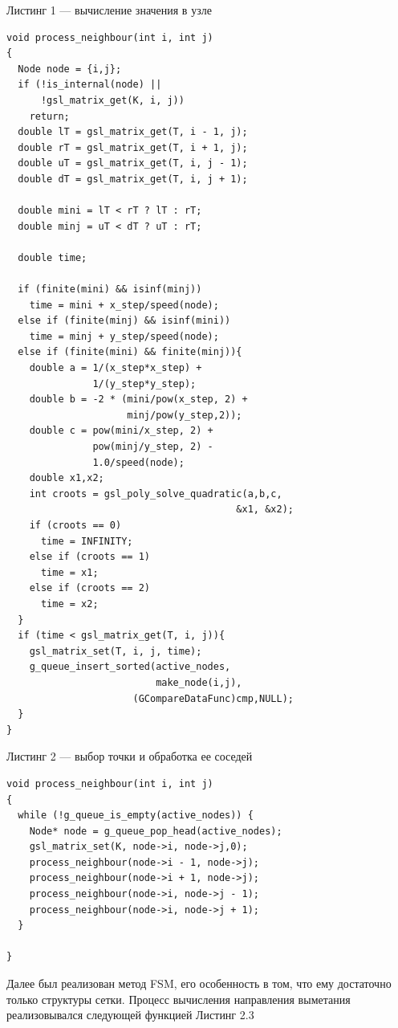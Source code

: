 \documentclass[a4paper,12pt]{article}
\begin{document}
\vspace{1em}
Листинг 1 --- вычисление значения в узле 
\normalsize
\begin{verbatim} 
void process_neighbour(int i, int j)
{
  Node node = {i,j};
  if (!is_internal(node) || 
      !gsl_matrix_get(K, i, j)) 
    return;
  double lT = gsl_matrix_get(T, i - 1, j);
  double rT = gsl_matrix_get(T, i + 1, j);
  double uT = gsl_matrix_get(T, i, j - 1);
  double dT = gsl_matrix_get(T, i, j + 1);

  double mini = lT < rT ? lT : rT;
  double minj = uT < dT ? uT : rT;

  double time;

  if (finite(mini) && isinf(minj))
    time = mini + x_step/speed(node);
  else if (finite(minj) && isinf(mini))
    time = minj + y_step/speed(node);
  else if (finite(mini) && finite(minj)){
    double a = 1/(x_step*x_step) + 
               1/(y_step*y_step);
    double b = -2 * (mini/pow(x_step, 2) +
                     minj/pow(y_step,2));
    double c = pow(mini/x_step, 2) + 
               pow(minj/y_step, 2) - 
               1.0/speed(node);
    double x1,x2;
    int croots = gsl_poly_solve_quadratic(a,b,c, 
                                        &x1, &x2);
    if (croots == 0)
      time = INFINITY;
    else if (croots == 1)
      time = x1;
    else if (croots == 2)
      time = x2;
  }
  if (time < gsl_matrix_get(T, i, j)){
    gsl_matrix_set(T, i, j, time);
    g_queue_insert_sorted(active_nodes,
                          make_node(i,j),
                      (GCompareDataFunc)cmp,NULL);
  }
}
\end{verbatim}
\large


\vspace{1em}
Листинг 2 --- выбор точки и обработка ее соседей
\normalsize
\begin{verbatim} 
void process_neighbour(int i, int j)
{
  while (!g_queue_is_empty(active_nodes)) {
    Node* node = g_queue_pop_head(active_nodes);
    gsl_matrix_set(K, node->i, node->j,0);
    process_neighbour(node->i - 1, node->j);
    process_neighbour(node->i + 1, node->j);
    process_neighbour(node->i, node->j - 1);
    process_neighbour(node->i, node->j + 1);
  }

}
\end{verbatim}
\large



Далее был реализован метод FSM, его особенность в том, что ему
достаточно только структуры сетки. Процесс вычисления направления
выметания реализовывался следующей функцией Листинг 2.3
\end{document}
